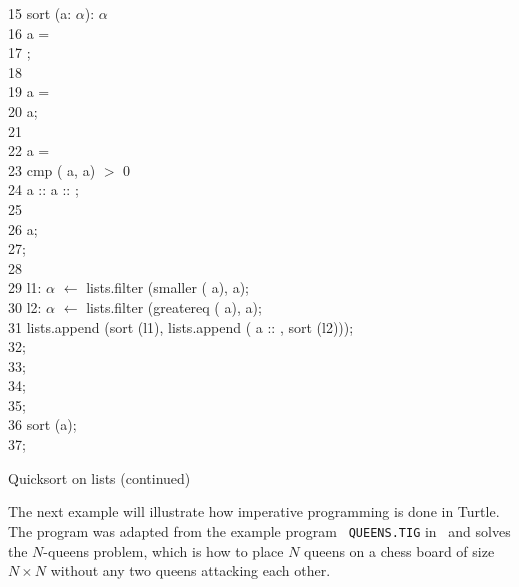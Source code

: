 \begin{appendix}
\begin{Program}
\begin{ttlprog}
15\>\>\ttlFun{} sort (a: \ttlList{} \ttlOf{} $\alpha$): \ttlList{} \ttlOf{} $\alpha$\\
16\>\>\>\ttlIf{} a = \ttlNull{} \ttlThen{}\\
17\>\>\>\>\ttlReturn{} \ttlNull{};\\
18\>\>\>\ttlElse{}\\
19\>\>\>\>\ttlIf{} \ttlTl{} a = \ttlNull{} \ttlThen{}\\
20\>\>\>\>\>\ttlReturn{} a;\\
21\>\>\>\>\ttlElse{}\\
22\>\>\>\>\>\ttlIf{} \ttlTl{} \ttlTl{} a = \ttlNull{} \ttlThen{}\\
23\>\>\>\>\>\>\ttlIf{} cmp (\ttlHd{} a, \ttlHd{} \ttlTl{} a) $>$ 0 \ttlThen{}\\
24\>\>\>\>\>\>\>\ttlReturn{} \ttlHd{} \ttlTl{} a :: \ttlHd{} a :: \ttlNull{};\\
25\>\>\>\>\>\>\ttlElse{}\\
26\>\>\>\>\>\>\>\ttlReturn{} a;\\
27\>\>\>\>\>\>\ttlEnd{};\\
28\>\>\>\>\>\ttlElse{}\\
29\>\>\>\>\>\>\ttlVar{} l1: \ttlList{} \ttlOf{} $\alpha$ $\leftarrow$ lists.filter (smaller (\ttlHd{} a), \ttlTl{} a);\\
30\>\>\>\>\>\>\ttlVar{} l2: \ttlList{} \ttlOf{} $\alpha$ $\leftarrow$ lists.filter (greatereq (\ttlHd{} a), \ttlTl{} a);\\
31\>\>\>\>\>\>\ttlReturn{} lists.append (sort (l1), lists.append (\ttlHd{} a :: \ttlNull{}, sort (l2)));\\
32\>\>\>\>\>\ttlEnd{};\\
33\>\>\>\>\ttlEnd{};\\
34\>\>\>\ttlEnd{};\\
35\>\>\ttlEnd{};\\
36\>\>\ttlReturn{} sort (a);\\
37\>\ttlEnd{};
\end{ttlprog}
\caption{Quicksort on lists (continued)}
\label{prog:example-module2}
\end{Program}

The next example will illustrate how imperative programming is done in
Turtle.  The program was adapted from the example program {\tt
  QUEENS.TIG} in~\cite{appel98moderncompiler} and solves the
$N$-queens problem, which is how to place $N$ queens on a chess board
of size $N\times N$ without any two queens attacking each other.


\end{appendix}
